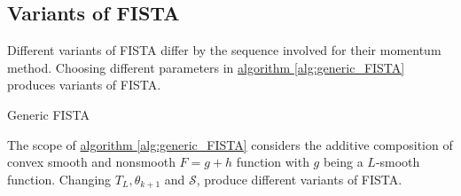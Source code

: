 \documentclass[]{article}
\theoremstyle{definition}
\numberwithin{equation}{subsection}
\begin{document}
    \subsection*{Variants of FISTA}
        Different variants of FISTA differ by the sequence involved for their momentum method. 
        Choosing different parameters in \hyperref[alg:generic_FISTA]{algorithm \ref*{alg:generic_FISTA}} produces variants of FISTA. 
        \begin{algorithm}[H]
            \begin{algorithmic}[1]
                \ENDFOR
            \end{algorithmic}
            \caption{Generic FISTA}
            \label{alg:generic_FISTA}
        \end{algorithm}
        The scope of \hyperref[alg:generic_FISTA]{algorithm \ref*{alg:generic_FISTA}} considers the additive composition of convex smooth and nonsmooth $F = g + h$ function with $g$ being a $L$-smooth function. 
        Changing $T_L, \theta_{k + 1}$ and $\mathcal S$, produce different variants of FISTA. 
\end{document}
